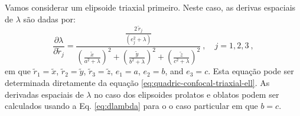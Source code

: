 Vamos considerar um elipsoide triaxial primeiro. Neste caso, as derivas espaciais de $\lambda$
são dadas por:
\begin{equation}
\frac{\partial \lambda}{\partial \tilde{r}_{j}} =
\frac{\frac{2 \, \tilde{r}_{j}}{\left( e_{j}^{2} + \lambda \right)}}{
	\left( \frac{\tilde{x}}{a^{2} + \lambda}\right)^{2} +
	\left( \frac{\tilde{y}}{b^{2} + \lambda}\right)^{2} + 
	\left( \frac{\tilde{z}}{c^{2} + \lambda}\right)^{2}} \: , \quad j = 1, 2, 3 \: ,
\label{eq:dlambda}
\end{equation}
em que 
$\tilde{r}_{1} = \tilde{x}$, $\tilde{r}_{2} = \tilde{y}$, $\tilde{r}_{3} = \tilde{z}$,
$e_{1} = a$, $e_{2} = b$, and $e_{3} = c$.
Esta equação pode ser determinada diretamente da equação \ref{eq:quadric-confocal-triaxial-ell}.
As derivadas espaciais de $\lambda$ no caso dos elipsoides prolatos e oblatos podem ser calculados usando
a Eq. \ref{eq:dlambda} para o o caso particular em que $b = c$.
